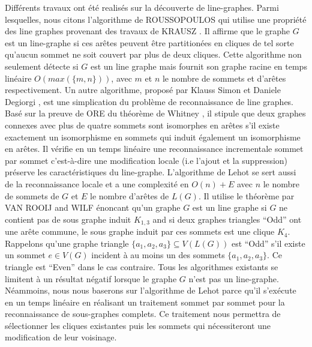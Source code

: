 Diff\'erents travaux ont \'et\'e realis\'es sur la d\'ecouverte de line-graphes.
Parmi lesquelles, nous citons  l'algorithme de ROUSSOPOULOS \cite{ROUSSOPOULOS1973108} qui utilise une propri\'et\'e des line graphes provenant des travaux de KRAUSZ \cite{krausz1943demonstration}. 
Il affirme que le graphe $G$ est un line-graphe si ces ar\^etes  peuvent \^etre partition\'ees en cliques  de tel sorte qu'aucun sommet ne soit couvert par plus de deux cliques. 
Cette algorithme non seulement d\'etecte si $G$ est un line graphe mais fournit son graphe racine en temps lin\'eaire $O(max(\{m,n\}))$, avec $m$ et $n$ le nombre de sommets et d'ar\^etes respectivement.
Un autre algorithme, propos\'e par Klauss Simon et Daniele Degiorgi \cite{decompositionEnCliques}, est une simplication du probl\`eme de reconnaissance de line graphes. Bas\'e sur la preuve de ORE \cite{ORE} du th\'eor\`eme de Whitney \cite{whitney1932congruent}, il stipule que deux graphes connexes avec plus de quatre sommets sont isomorphes en ar\^etes s'il existe exactement un isomorphisme en sommets qui induit \'egalement un isomorphisme en ar\^etes. Il v\'erifie en un temps lin\'eaire une reconnaissance incrementale  sommet par sommet c'est-\`a-dire une modification locale (i.e l'ajout et la suppression) pr\'eserve les caract\'eristiques du line-graphe.
L'algorithme de Lehot \cite{decompositionEnCliquesParArcs} se sert aussi de la reconnaissance locale et a une complexit\'e en $O(n) + E$ avec $n$ le nombre de sommets de $G$ et $E$ le nombre d'ar\^etes de $L(G)$.
Il utilise le th\'eor\`eme par VAN ROOIJ and WILF \cite{ROOIJetWILF1965interchange} \'enoncant qu'un graphe $G$ est un line graphe si $G$ ne contient pas de sous graphe induit $K_{1,3}$ and si deux graphes triangles ``Odd'' ont une ar\^ete commune, le sous graphe induit par ces sommets est une clique $K_4$. Rappelons qu'une graphe triangle $\{a_1,a_2,a_3\} \subseteq V(L(G))$ est ``Odd'' s'il existe un sommet $e \in V(G)$ incident \`a  au moins un des sommets $\{a_1, a_2, a_3\}$. Ce triangle est ``Even'' dans le cas contraire. 
\newline
Tous les algorithmes existants se limitent \`a un r\'esultat n\'egatif lorsque le graphe $G$ n'est pas un line-graphe. N\'eammoins, nous nous baserons sur l'algorithme de Lehot parce qu'il s'ex\'ecute en un temps lin\'eaire en r\'ealisant un traitement sommet par sommet pour la reconnaissance de sous-graphes complets. Ce traitement nous permettra de s\'electionner les cliques existantes puis les sommets qui n\'ecessiteront une modification de leur voisinage.